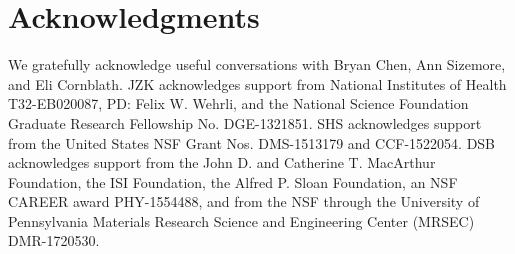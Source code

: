 \documentclass[%
preprint,
 amsmath,amssymb,
 aps,
]{revtex4-1}
\begin{document}
\section{Acknowledgments}
\noindent We gratefully acknowledge useful conversations with Bryan Chen, Ann Sizemore, and Eli Cornblath. JZK acknowledges support from National Institutes of Health T32-EB020087, PD: Felix W. Wehrli, and the National Science Foundation Graduate Research Fellowship No. DGE-1321851. SHS acknowledges support from the United States NSF Grant Nos. DMS-1513179 and CCF-1522054. DSB acknowledges support from the John D. and Catherine T. MacArthur Foundation, the ISI Foundation, the Alfred P. Sloan Foundation, an NSF CAREER award PHY-1554488, and from the NSF through the University of Pennsylvania Materials Research Science and Engineering Center (MRSEC) DMR-1720530.
\end{document}
